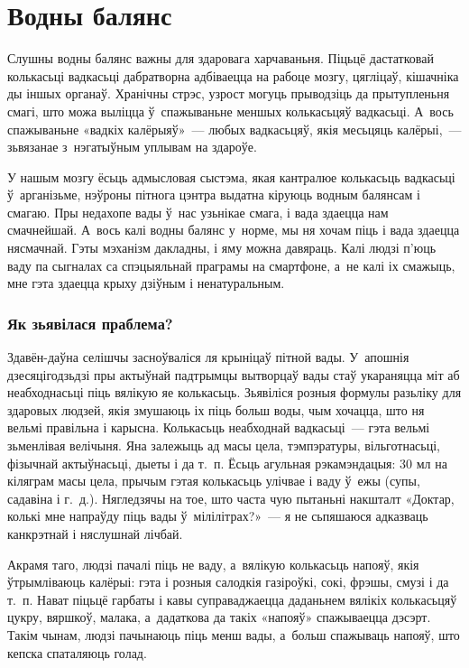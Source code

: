 \chapter{Водны балянс}

Слушны водны балянс важны для здаровага харчаваньня. Піцьцё дастатковай колькасьці вадкасьці дабратворна адбіваецца на рабоце мозгу, цягліцаў, кішачніка ды іншых органаў. Хранічны стрэс, узрост могуць прыводзіць да прытупленьня смагі, што можа выліцца ў~спажываньне меншых колькасьцяў вадкасьці. А~вось спажываньне «вадкіх калёрыяў»~--- любых вадкасьцяў, якія месьцяць калёрыі,~--- зьвязанае з~нэгатыўным уплывам на здароўе.

У нашым мозгу ёсьць адмысловая сыстэма, якая кантралюе колькасьць вадкасьці ў~арганізьме, нэўроны пітнога цэнтра выдатна кіруюць водным балянсам і смагаю. Пры недахопе вады ў~нас узьнікае смага, і вада здаецца нам смачнейшай. А~вось калі водны балянс у~норме, мы ня хочам піць і вада здаецца нясмачнай. Гэты мэханізм дакладны, і яму можна давяраць. Калі людзі п'юць ваду па сыгналах са спэцыяльнай праграмы на смартфоне, а~не калі іх смажыць, мне гэта здаецца крыху дзіўным і ненатуральным.

\subsection{Як зьявілася праблема?}

Здавён-даўна селішчы засноўваліся ля крыніцаў пітной вады. У~апошнія дзесяцігодзьдзі пры актыўнай падтрымцы вытворцаў вады стаў укараняцца міт аб неабходнасьці піць вялікую яе колькасьць. Зьявіліся розныя формулы разьліку для здаровых людзей, якія змушаюць іх піць больш воды, чым хочацца, што ня вельмі правільна і карысна. Колькасьць неабходнай вадкасьці~--- гэта вельмі зьменлівая велічыня. Яна залежыць ад масы цела, тэмпэратуры, вільготнасьці, фізычнай актыўнасьці, дыеты і да т.~п. Ёсьць агульная рэкамэндацыя: 30 мл на кіляграм масы цела, прычым гэтая колькасьць улічвае і ваду ў~ежы (супы, садавіна і г.~д.). Нягледзячы на тое, што часта чую пытаньні накшталт «Доктар, колькі мне напраўду піць вады ў~мілілітрах?»~--- я не сьпяшаюся адказваць канкрэтнай і няслушнай лічбай.

Акрамя таго, людзі пачалі піць не ваду, а~вялікую колькасьць напояў, якія ўтрымліваюць калёрыі: гэта і розныя салодкія газіроўкі, сокі, фрэшы, смузі і да т.~п. Нават піцьцё гарбаты і кавы суправаджаецца даданьнем вялікіх колькасьцяў цукру, вяршкоў, малака, а~дадаткова да такіх «напояў» спажываецца дэсэрт. Такім чынам, людзі пачынаюць піць менш вады, а~больш спажываць напояў, што кепска спаталяюць голад.

